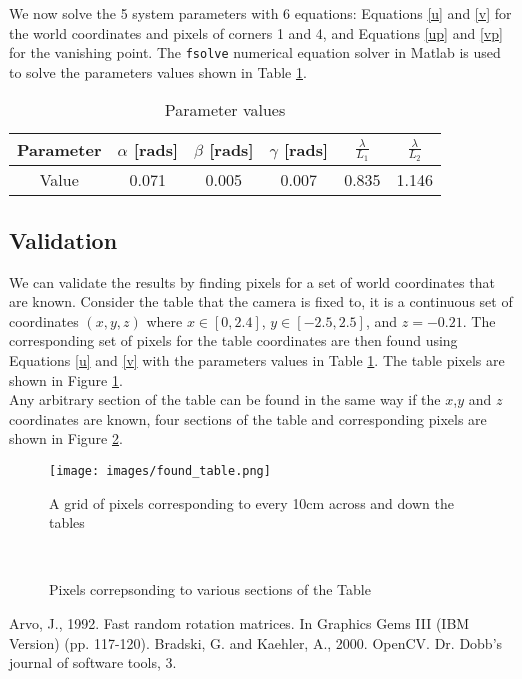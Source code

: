 \documentclass[12pt]{article}
\begin{document}
We now solve the 5 system parameters with 6 equations: Equations \ref{u} and \ref{v} for the world coordinates and pixels of corners 1 and 4, and Equations \ref{up} and \ref{vp} for the vanishing point. The \texttt{fsolve} numerical equation solver in Matlab is used to solve the parameters values shown in Table \ref{table:results}.


\begin{table}[!htb]
\centering
\begin{tabular}{|c|c|c|c|c|c|}
\hline
Parameter & $\alpha$ [rads] & $\beta$ [rads] & $\gamma$ [rads] & $\frac{\lambda}{L_1}$ & $\frac{\lambda}{L_2}$\\
\hline
Value & 0.071 & 0.005 & 0.007 & 0.835 & 1.146 \\
\hline
\end{tabular}
\caption{Parameter values}
\label{table:results}
\end{table}


\subsection{Validation}
We can validate the results by finding pixels for a set of world coordinates that are known. Consider the table that the camera is fixed to, it is a continuous set of coordinates $(x,y,z)$ where $x \in \left[0,2.4\right]$,  $y \in \left[-2.5,2.5\right]$, and $z=-0.21$.  The corresponding set of pixels for the table coordinates are then found using Equations \ref{u} and \ref{v} with the parameters values in Table \ref{table:results}. The table pixels are shown in Figure \ref{fig:result}. \\

Any arbitrary section of the table can be found in the same way if the $x$,$y$ and $z$ coordinates are known, four sections of the table and corresponding pixels are shown in Figure \ref{fig:multi_table}.


\begin{figure}[h]
\centering
\texttt{[image: images/found\_table.png]}
\caption{A grid of pixels corresponding to every 10cm across and down the tables}\label{fig:result}
\end{figure}

\begin{figure}[h]
    \centering
    \qquad
	\\
    \qquad
    \caption{Pixels correpsonding to various sections of the Table}%
    \label{fig:multi_table}%
\end{figure}


\begin{thebibliography}{9}
Arvo, J., 1992. Fast random rotation matrices. In Graphics Gems III (IBM Version) (pp. 117-120).
Bradski, G. and Kaehler, A., 2000. OpenCV. Dr. Dobb’s journal of software tools, 3.
\end{thebibliography}
\end{document}
